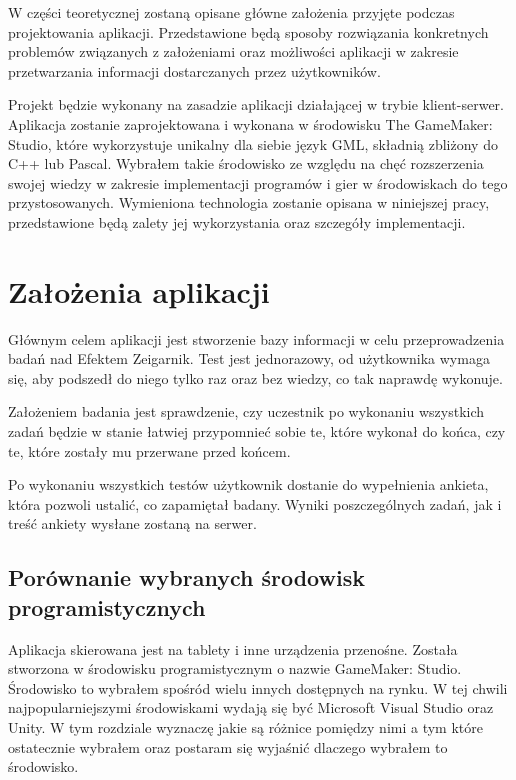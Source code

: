 \documentclass[openright]{xmgr}
\begin{document}
W części teoretycznej zostaną opisane główne założenia przyjęte podczas projektowania aplikacji. Przedstawione będą sposoby rozwiązania konkretnych problemów związanych z założeniami oraz możliwości aplikacji w zakresie przetwarzania informacji dostarczanych przez użytkowników.

Projekt będzie wykonany na zasadzie aplikacji działającej w trybie klient-serwer. Aplikacja zostanie zaprojektowana i wykonana w środowisku The GameMaker: Studio, które wykorzystuje unikalny dla siebie język GML, składnią zbliżony do C++ lub Pascal. Wybrałem takie środowisko ze względu na chęć rozszerzenia swojej wiedzy w zakresie implementacji programów i gier w środowiskach do tego przystosowanych. Wymieniona technologia zostanie opisana w niniejszej pracy, przedstawione będą zalety jej wykorzystania oraz szczegóły implementacji.




\chapter{Założenia aplikacji}
Głównym celem aplikacji jest stworzenie bazy informacji w celu przeprowadzenia badań nad Efektem Zeigarnik. Test jest jednorazowy, od użytkownika wymaga się, aby podszedł do niego tylko raz oraz bez wiedzy, co tak naprawdę wykonuje.

Założeniem badania jest sprawdzenie, czy uczestnik po wykonaniu wszystkich zadań będzie w stanie łatwiej przypomnieć sobie te, które wykonał do końca, czy te, które zostały mu przerwane przed końcem.

Po wykonaniu wszystkich testów użytkownik dostanie do wypełnienia ankieta, która pozwoli ustalić, co zapamiętał badany. Wyniki poszczególnych zadań, jak i treść ankiety wysłane zostaną na serwer.

\section{Porównanie wybranych środowisk programistycznych}
Aplikacja skierowana jest na tablety i inne urządzenia przenośne. Została stworzona w środowisku programistycznym o nazwie GameMaker: Studio. Środowisko to wybrałem spośród wielu innych dostępnych na rynku. W tej chwili najpopularniejszymi środowiskami wydają się być Microsoft Visual Studio oraz Unity. W tym rozdziale wyznaczę jakie są różnice pomiędzy nimi a tym które ostatecznie wybrałem oraz postaram się wyjaśnić dlaczego wybrałem to środowisko.
\end{document}
